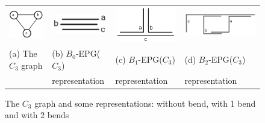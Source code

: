 \begin{figure}[h]
  \begin{tabular}{ p{2.5cm} p{2.6cm} p{3.7cm} p{2.5cm} }
     \includegraphics[width=2.3cm, left]{./img/trianguloabc.png} & \includegraphics[width=2.5cm]{./img/b0epgtriangulo.png} & \includegraphics[width=3.5cm, left]{./img/b1epgtriangulo.png} & 
  \includegraphics[width=5cm]{./img/b2epgtriangulo.png}\\%
    \footnotesize (a) The $C_3$ graph & \footnotesize(b) $B_0$-EPG($C_3$)  & \footnotesize \centering (c) $B_1$-EPG($C_3$)  &  \footnotesize  (d) $B_2$-EPG($C_3$) \\
 \footnotesize & \footnotesize \centering representation & \centering  \footnotesize representation  & \footnotesize \centering representation\\  
  \end{tabular}
 \caption{The $ C_3 $ graph  and some representations: without bend, with 1 bend and with 2 bends} \label{fig:trianguloepgRepresentacao}
\end{figure}